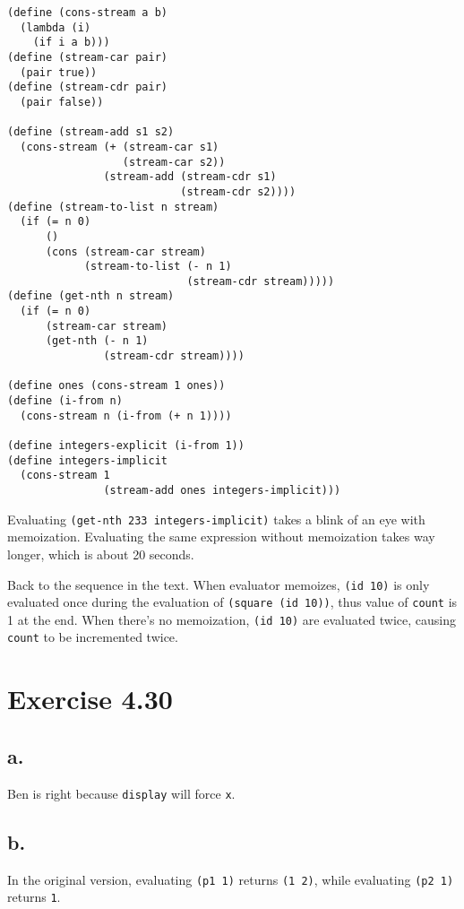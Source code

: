 \documentclass[../main.tex]{subfiles}
\begin{document}
\begin{lstlisting}
(define (cons-stream a b)
  (lambda (i)
    (if i a b)))
(define (stream-car pair)
  (pair true))
(define (stream-cdr pair)
  (pair false))

(define (stream-add s1 s2)
  (cons-stream (+ (stream-car s1)
                  (stream-car s2))
               (stream-add (stream-cdr s1)
                           (stream-cdr s2))))
(define (stream-to-list n stream)
  (if (= n 0)
      ()
      (cons (stream-car stream)
            (stream-to-list (- n 1)
                            (stream-cdr stream)))))
(define (get-nth n stream)
  (if (= n 0)
      (stream-car stream)
      (get-nth (- n 1)
               (stream-cdr stream))))

(define ones (cons-stream 1 ones))
(define (i-from n)
  (cons-stream n (i-from (+ n 1))))

(define integers-explicit (i-from 1))
(define integers-implicit
  (cons-stream 1
               (stream-add ones integers-implicit)))
\end{lstlisting}

Evaluating \lstinline{(get-nth 233 integers-implicit)} takes a blink of an eye with memoization. Evaluating the same expression without memoization takes way longer, which is about 20 seconds.

Back to the sequence in the text. When evaluator memoizes, \lstinline{(id 10)} is only evaluated once during the evaluation of \lstinline{(square (id 10))}, thus value of \lstinline{count} is 1 at the end. When there's no memoization, \lstinline{(id 10)} are evaluated twice, causing \lstinline{count} to be incremented twice.

\section{Exercise 4.30}

\subsection{a.}

Ben is right because \lstinline{display} will force \lstinline{x}.

\subsection{b.}

In the original version, evaluating \lstinline{(p1 1)} returns \lstinline{(1 2)}, while evaluating \lstinline{(p2 1)} returns \lstinline{1}.
\end{document}
